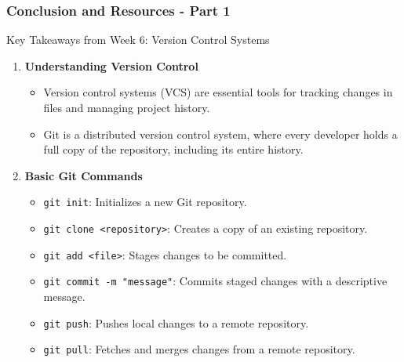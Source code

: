 \documentclass{beamer}
\begin{document}
\begin{frame}[fragile]
    \frametitle{Conclusion and Resources - Part 1}
    \begin{block}{Key Takeaways from Week 6: Version Control Systems}
        \begin{enumerate}
            \item \textbf{Understanding Version Control}
                \begin{itemize}
                    \item Version control systems (VCS) are essential tools for tracking changes in files and managing project history.
                    \item Git is a distributed version control system, where every developer holds a full copy of the repository, including its entire history.
                \end{itemize}
            \item \textbf{Basic Git Commands}
                \begin{itemize}
                    \item \texttt{git init}: Initializes a new Git repository.
                    \item \texttt{git clone <repository>}: Creates a copy of an existing repository.
                    \item \texttt{git add <file>}: Stages changes to be committed.
                    \item \texttt{git commit -m "message"}: Commits staged changes with a descriptive message.
                    \item \texttt{git push}: Pushes local changes to a remote repository.
                    \item \texttt{git pull}: Fetches and merges changes from a remote repository.
                \end{itemize}
        \end{enumerate}
    \end{block}
\end{frame}
\end{document}
